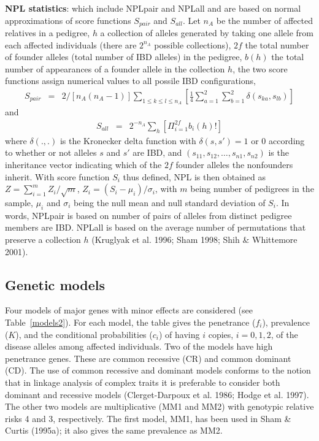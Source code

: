 {\bf NPL statistics}:  which include NPLpair and NPLall and are based on normal
approximations of score functions $S_{pair}$ and $S_{all}$.  Let $n_A$ be the
number of affected relatives in a pedigree, $h$ a collection of alleles
generated by taking one allele from each affected individuals (there are
$2^{n_A}$ possible collections), $2f$ the total number of founder alleles
(total number of IBD alleles) in the pedigree, $b(h)$ the total number of
appearances of a founder allele in the collection $h$, the two score functions
assign numerical values to all possile IBD configurations,
\begin{eqnarray*}
S_{pair} &=&{2}/{[n_A(n_A-1)]}\sum_{1\leq k\leq l\leq n_A}
\left[\frac{1}{4}\sum_{a=1}^2\sum_{b=1}^2\delta(s_{ka},s_{lb})\right]
\end{eqnarray*} and
\begin{eqnarray*}
S_{all}&=&2^{-n_A}\sum_h \left[\Pi_{i=1}^{2f}b_i(h)!\right]
\end{eqnarray*}
where $\delta(.,.)$ is the Kronecker delta function with $\delta(s,s')=1$ or
$0$ according to whether or not alleles $s$ and $s'$ are IBD, and $(s_{11},
s_{12},\ldots,s_{n1},s_{n2})$ is the inheritance vector indicating which of the
$2f$ founder alleles the nonfounders inherit.  With score function $S_i$ thus
defined, NPL is then obtained as $Z=\sum_{i=1}^mZ_i/\sqrt{m}$,
$Z_i=(S_i-\mu_i)/\sigma_i$, with $m$ being number of pedigrees in the sample,
$\mu_i$ and $\sigma_i$ being the null mean and null standard deviation of
$S_i$.  In words, NPLpair is based on number of pairs of alleles from distinct
pedigree members are IBD.  NPLall is based on the average number of
permutations that preserve a collection $h$ (Kruglyak et al.  1996; Sham 1998;
Shih \& Whittemore 2001).

\subsection*{Genetic models}

Four models of major genes with minor effects are considered (see
Table~\ref{models2}).  For each model, the table gives the penetrance ($f_i$),
prevalence ($K$), and the conditional probabilities ($c_i$) of having $i$
copies, $i=0, 1, 2$, of the disease alleles among affected individuals.  Two
of the models have high penetrance genes.  These are common recessive (CR) and
common dominant (CD).  The use of common recessive and dominant models
conforms to the notion that in linkage analysis of complex traits it is
preferable to consider both dominant and recessive models (Clerget-Darpoux et
al.  1986; Hodge et al.  1997).  The other two models are multiplicative (MM1
and MM2) with genotypic relative risks 4 and 3, respectively. The first 
model, MM1, has been used in Sham \& Curtis (1995a); it also gives the same 
prevalence as MM2. 

